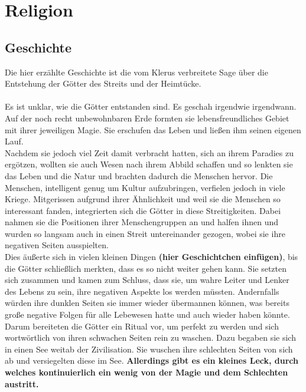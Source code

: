 \chapter{Religion}
\section{Geschichte}
Die hier erzählte Geschichte ist die vom Klerus verbreitete Sage über die Entstehung der Götter des Streits und der Heimtücke. \\\\
Es ist unklar, wie die Götter entstanden sind. Es geschah irgendwie irgendwann. Auf der noch recht unbewohnbaren Erde formten sie lebensfreundliches Gebiet mit ihrer jeweiligen Magie. Sie erschufen das Leben und ließen ihm seinen eigenen Lauf.\\
Nachdem sie jedoch viel Zeit damit verbracht hatten, sich an ihrem Paradies zu ergötzen, wollten sie auch Wesen nach ihrem Abbild schaffen und so lenkten sie das Leben und die Natur und brachten dadurch die Menschen hervor. Die Menschen, intelligent genug um Kultur aufzubringen, verfielen jedoch in viele Kriege. Mitgerissen aufgrund ihrer Ähnlichkeit und weil sie die Menschen so interessant fanden, integrierten sich die Götter in diese Streitigkeiten. Dabei nahmen sie die Positionen ihrer Menschengruppen an und halfen ihnen und wurden so langsam auch in einen Streit untereinander gezogen, wobei sie ihre negativen Seiten ausspielten.\\
Dies äußerte sich in vielen kleinen Dingen \textbf{(hier Geschichtchen einfügen)}, bis die Götter schließlich merkten, dass es so nicht weiter gehen kann. Sie setzten sich zusammen und kamen zum Schluss, dass sie, um wahre Leiter und Lenker des Lebens zu sein, ihre negativen Aspekte los werden müssten. Andernfalls würden ihre dunklen Seiten sie immer wieder übermannen können, was bereits große negative Folgen für alle Lebewesen hatte und auch wieder haben könnte.\\
Darum bereiteten die Götter ein Ritual vor, um perfekt zu werden und sich wortwörtlich von ihren schwachen Seiten rein zu waschen. Dazu begaben sie sich in einen See weitab der Zivilisation. Sie wuschen ihre schlechten Seiten von sich ab und versiegelten diese im See. \textbf{Allerdings gibt es ein kleines Leck, durch welches kontinuierlich ein wenig von der Magie und dem Schlechten austritt.}\\

